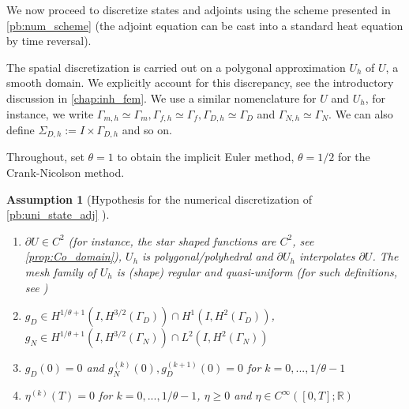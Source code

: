 \documentclass[english,a4paper,10pt,oneside]{scrbook}	%
\theoremstyle{break}
\newtheorem{ass}[equation]{Assumption}
\theoremstyle{remark}
\newcommand{\mR}{\mathbb{R}}
\begin{document}
We now proceed to discretize states and adjoints using the scheme presented in \cref{pb:num_scheme} (the adjoint equation can be cast into a standard heat equation by time reversal).



The spatial discretization is carried out on a polygonal approximation $U_h$ of $U$, a smooth domain. We explicitly account for this discrepancy, see the introductory discussion in \cref{chap:inh_fem}.  We use a similar nomenclature for $U$ and $U_h$, for instance, we write $\Gamma_{m,h}\simeq \Gamma_m, \Gamma_{f,h}\simeq \Gamma_f, \Gamma_{D,h}\simeq \Gamma_D$ and $\Gamma_{N,h}\simeq \Gamma_N$. We can also define $\Sigma_{D,h}:= I \times \Gamma_{D,h}$ and so on.


Throughout, set $\theta=1$ to obtain the implicit Euler method, $\theta=1/2$ for the Crank-Nicolson method.

\begin{ass}[Hypothesis for the numerical discretization of \cref{pb:uni_state_adj} ]
\label{ass:num_discr_shopt}
\textcolor{white}{ }
\begin{enumerate}
	\item $\partial U \in C^2$ (for instance, the star shaped functions are $C^2$, see \cref{prop:Co_domain}), $U_h$ is polygonal/polyhedral and $\partial U_h$ interpolates $\partial U$. The mesh family of $U_h$ is (shape) regular and quasi-uniform (for such definitions, see \cite{brenner_scott})
	\item $g_D \in  H^{1/\theta+1}(I,H^{3/2}(\Gamma_D)) \cap H^1(I, H^{2}(\Gamma_D))$, $g_N \in  H^{1/\theta+1}(I, H^{3/2}(\Gamma_N)) \cap L^2(I, H^{2}(\Gamma_N))$
	\item $g_D(0)=0$ and $g_N^{(k)}(0), g_D^{(k+1)}(0)  = 0$ for $k=0,..., 1/\theta-1$
	\item $\eta^{(k)}(T)  = 0$ for $k=0,..., 1/\theta-1$, $\eta \geq 0$ and $\eta \in C^{\infty}([0,T];\mR)$
\end{enumerate}

\end{ass}
\end{document}

